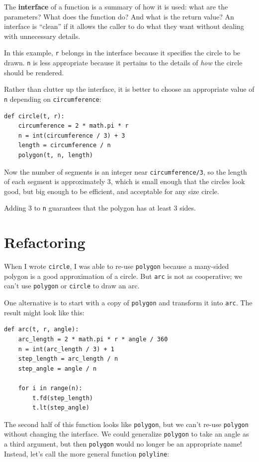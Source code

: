 \documentclass[10pt]{book}
\begin{document}
The {\bf interface} of a function is a summary of how it is used: what
are the parameters?  What does the function do?  And what is the return
value?  An interface is ``clean'' if it allows the caller to do
what they want without dealing with unnecessary details.

In this example, {\tt r} belongs in the interface because it
specifies the circle to be drawn.  {\tt n} is less appropriate
because it pertains to the details of {\em how} the circle should
be rendered.

Rather than clutter up the interface, it is better
to choose an appropriate value of {\tt n}
depending on {\tt circumference}:

\begin{verbatim}
def circle(t, r):
    circumference = 2 * math.pi * r
    n = int(circumference / 3) + 3
    length = circumference / n
    polygon(t, n, length)
\end{verbatim}
%
Now the number of segments is an integer near {\tt circumference/3},
so the length of each segment is approximately 3, which is small
enough that the circles look good, but big enough to be efficient,
and acceptable for any size circle.

Adding 3 to {\tt n} guarantees that the polygon has at least 3 sides.


\section{Refactoring}
\label{refactoring}

When I wrote {\tt circle}, I was able to re-use {\tt polygon}
because a many-sided polygon is a good approximation of a circle.
But {\tt arc} is not as cooperative; we can't use {\tt polygon}
or {\tt circle} to draw an arc.

One alternative is to start with a copy
of {\tt polygon} and transform it into {\tt arc}.  The result
might look like this:

\begin{verbatim}
def arc(t, r, angle):
    arc_length = 2 * math.pi * r * angle / 360
    n = int(arc_length / 3) + 1
    step_length = arc_length / n
    step_angle = angle / n
    
    for i in range(n):
        t.fd(step_length)
        t.lt(step_angle)
\end{verbatim}
%
The second half of this function looks like {\tt polygon}, but we
can't re-use {\tt polygon} without changing the interface.  We could
generalize {\tt polygon} to take an angle as a third argument,
but then {\tt polygon} would no longer be an appropriate name!
Instead, let's call the more general function {\tt polyline}:
\end{document}
